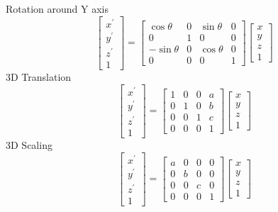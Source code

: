 \documentclass{article}[18pt]
\begin{document}
Rotation around Y axis
$$
\left[\begin{array}{c}{x^{\prime}} \\ {y^{\prime}} \\ {z^{\prime}} \\ {1}\end{array}\right]=\left[\begin{array}{cccc}{\cos \theta} & {0} & {\sin \theta} & {0} \\ {0} & {1} & {0} & {0} \\ {-\sin \theta} & {0} & {\cos \theta} & {0} \\ {0} & {0} & {0} & {1}\end{array}\right]\left[\begin{array}{l}{x} \\ {y} \\ {z} \\ {1}\end{array}\right]
$$
3D Translation
$$
\left[\begin{array}{c}{x^{\prime}} \\ {y^{\prime}} \\ {z^{\prime}} \\ {1}\end{array}\right]=\left[\begin{array}{cccc}{1} & {0} & {0} & {a} \\ {0} & {1} & {0} & {b} \\ {0} & {0} & {1} & {c} \\ {0} & {0} & {0} & {1}\end{array}\right]\left[\begin{array}{l}{x} \\ {y} \\ {z} \\ {1}\end{array}\right]
$$
3D Scaling
$$
\left[\begin{array}{c}{x^{\prime}} \\ {y^{\prime}} \\ {z^{\prime}} \\ {1}\end{array}\right]=\left[\begin{array}{cccc}{a} & {0} & {0} & {0} \\ {0} & {b} & {0} & {0} \\ {0} & {0} & {c} & {0} \\ {0} & {0} & {0} & {1}\end{array}\right]\left[\begin{array}{l}{x} \\ {y} \\ {z} \\ {1}\end{array}\right]
$$
\end{document}
